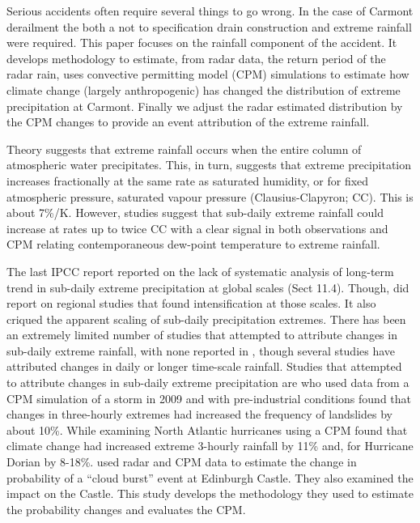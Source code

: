 \documentclass[11pt,a4paper]{article}
\begin{document}
 Serious accidents often require several things to go wrong. In the case of Carmont derailment  the both a not to specification drain construction and extreme rainfall were required. This paper focuses on the rainfall component of the accident. It develops methodology to estimate, from radar data, the return period of the radar rain, uses convective permitting model (CPM) simulations to estimate how climate change (largely anthropogenic) has changed the distribution of extreme precipitation at Carmont. Finally we adjust the radar estimated distribution by the CPM changes to provide an event attribution of the extreme rainfall. 

Theory\parencite{allen02insight} suggests that extreme rainfall occurs when the entire column of atmospheric water precipitates. This, in turn,  suggests that extreme precipitation increases fractionally at the same rate as saturated humidity, or for fixed atmospheric pressure, saturated vapour pressure (Clausius-Clapyron; CC). This is about 7\%/K. However,  studies suggest that sub-daily extreme rainfall  could increase  at rates  up to twice CC\parencite{fowler2021rainfall_extremes} with a clear signal in both observations and CPM relating contemporaneous dew-point temperature to extreme rainfall. 

The last IPCC report\parencite{Seneviratne2021ippcc_chapter_extremes} reported on the lack of systematic analysis of long-term trend in sub-daily extreme precipitation at global scales (Sect 11.4). Though, did report on regional studies that found intensification at those scales. It also criqued the apparent scaling of sub-daily precipitation extremes. There has  been an extremely limited number of studies that attempted to attribute changes in sub-daily extreme rainfall, with none reported in \cite{Seneviratne2021ippcc_chapter_extremes},  though several studies have attributed changes in daily or longer time-scale rainfall\parencite{clarke2022extreme_Attribution,Zhang2020rainfall,tradowsky2023w_europe_rain}.  Studies that attempted to attribute changes in sub-daily extreme precipitation are \cite{mishra2023landslide} who used  data from a CPM simulation of a storm in 2009 and with pre-industrial conditions found that changes in three-hourly extremes had increased the frequency of landslides by about 10\%. While \cite{Reed2022,Reed2021dorian_extreme_rain} examining North Atlantic hurricanes  using a CPM found that climate change had increased extreme 3-hourly rainfall by 11\% and, for Hurricane Dorian by 8-18\%. \cite{tett2023edinburgh} used radar and CPM data to estimate the change in probability of a ``cloud burst'' event at Edinburgh Castle. They also examined the impact on the Castle.  This study develops the methodology they used to estimate the probability changes and evaluates the CPM. 
\end{document}
